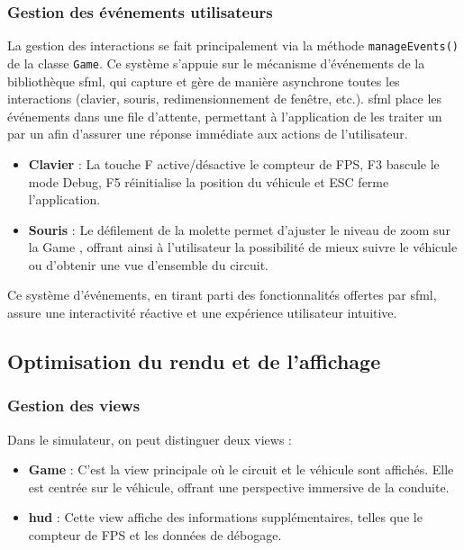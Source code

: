 \subsubsection{Gestion des événements utilisateurs}\label{subsubsec:gestion-des-evenements-utilisateurs}
La gestion des interactions se fait principalement via la méthode \texttt{manageEvents()} de la classe \texttt{Game}.
Ce système s'appuie sur le mécanisme d'événements de la bibliothèque \gls{sfml}, qui capture et gère de manière asynchrone toutes les interactions (clavier, souris, redimensionnement de fenêtre, etc.).
\gls{sfml} place les événements dans une file d'attente, permettant à l'application de les traiter un par un afin d'assurer une réponse immédiate aux actions de l'utilisateur.

\begin{itemize}
    \item \textbf{Clavier} : La touche F active/désactive le compteur de FPS, F3 bascule le mode Debug, F5 réinitialise la position du véhicule et ESC ferme l'application.
    \item \textbf{Souris} : Le défilement de la molette permet d'ajuster le niveau de zoom sur la Game , offrant ainsi à l'utilisateur la possibilité de mieux suivre le véhicule ou d'obtenir une vue d'ensemble du circuit.
\end{itemize}

Ce système d'événements, en tirant parti des fonctionnalités offertes par \gls{sfml}, assure une interactivité réactive et une expérience utilisateur intuitive.

\subsection{Optimisation du rendu et de l'affichage}\label{subsec:optimisation-du-rendu-et-de-l-affichage}
\subsubsection{Gestion des \glspl{view}}\label{subsubsec:gestion-des-vues}
Dans le simulateur, on peut distinguer deux \glspl{view} :
\begin{itemize}
    \item \textbf{Game } : C'est la \gls{view} principale où le circuit et le véhicule sont affichés.
    Elle est centrée sur le véhicule, offrant une perspective immersive de la conduite.
    \item \textbf{\gls{hud} } : Cette \gls{view} affiche des informations supplémentaires, telles que le compteur de FPS et les données de débogage.
\end{itemize}


